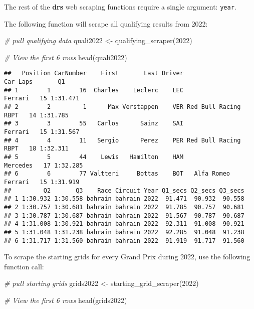 \documentclass[
]{book}
\newenvironment{Shaded}{\begin{snugshade}}{\end{snugshade}}
\newcommand{\CommentTok}[1]{\textcolor[rgb]{0.56,0.35,0.01}{\textit{#1}}}
\newcommand{\DecValTok}[1]{\textcolor[rgb]{0.00,0.00,0.81}{#1}}
\newcommand{\FunctionTok}[1]{\textcolor[rgb]{0.00,0.00,0.00}{#1}}
\newcommand{\NormalTok}[1]{#1}
\newcommand{\OtherTok}[1]{\textcolor[rgb]{0.56,0.35,0.01}{#1}}
\begin{document}
The rest of the \textbf{drs} web scraping functions require a single argument: \texttt{year}.

The following function will scrape all qualifying results from 2022:

\begin{Shaded}
\begin{Highlighting}[]
\CommentTok{\# pull qualifying data}
\NormalTok{quali2022 }\OtherTok{\textless{}{-}} \FunctionTok{qualifying\_scraper}\NormalTok{(}\DecValTok{2022}\NormalTok{)}

\CommentTok{\# View the first 6 rows}
\FunctionTok{head}\NormalTok{(quali2022)}
\end{Highlighting}
\end{Shaded}

\begin{verbatim}
##   Position CarNumber    First       Last Driver                  Car Laps       Q1
## 1        1        16  Charles    Leclerc    LEC              Ferrari   15 1:31.471
## 2        2         1      Max Verstappen    VER Red Bull Racing RBPT   14 1:31.785
## 3        3        55   Carlos      Sainz    SAI              Ferrari   15 1:31.567
## 4        4        11   Sergio      Perez    PER Red Bull Racing RBPT   18 1:32.311
## 5        5        44    Lewis   Hamilton    HAM             Mercedes   17 1:32.285
## 6        6        77 Valtteri     Bottas    BOT   Alfa Romeo Ferrari   15 1:31.919
##         Q2       Q3    Race Circuit Year Q1_secs Q2_secs Q3_secs
## 1 1:30.932 1:30.558 bahrain bahrain 2022  91.471  90.932  90.558
## 2 1:30.757 1:30.681 bahrain bahrain 2022  91.785  90.757  90.681
## 3 1:30.787 1:30.687 bahrain bahrain 2022  91.567  90.787  90.687
## 4 1:31.008 1:30.921 bahrain bahrain 2022  92.311  91.008  90.921
## 5 1:31.048 1:31.238 bahrain bahrain 2022  92.285  91.048  91.238
## 6 1:31.717 1:31.560 bahrain bahrain 2022  91.919  91.717  91.560
\end{verbatim}

To scrape the starting grids for every Grand Prix during 2022, use the following function call:

\begin{Shaded}
\begin{Highlighting}[]
\CommentTok{\# pull starting grids}
\NormalTok{grids2022 }\OtherTok{\textless{}{-}} \FunctionTok{starting\_grid\_scraper}\NormalTok{(}\DecValTok{2022}\NormalTok{)}

\CommentTok{\# View the first 6 rows}
\FunctionTok{head}\NormalTok{(grids2022)}
\end{Highlighting}
\end{Shaded}
\end{document}
